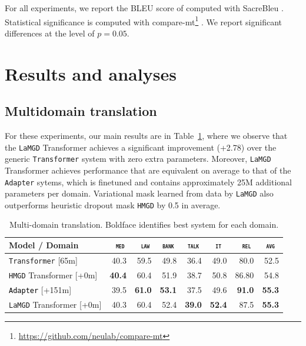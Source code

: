 \documentclass[11pt]{article}
\newcommand{\fyDone}[1]{\done[FY]\Todo[FY:]{\textcolor{orange}{#1}}}
\newcommand{\revision}[1]{\textcolor{black}{#1}}
\newcommand{\domain}[1]{\texttt{\textsc{#1}}}
\newcommand{\system}[1]{\texttt{{#1}}}
\newcommand{\SB}[1]{\textbf{#1}}
\begin{document}
For all experiments, we report the BLEU score of \citet{Papineni02bleu} computed with SacreBleu \citep{Post18call}. Statistical significance is computed with compare-mt\footnote{\url{https://github.com/neulab/compare-mt}} \cite{Neubig19compare-mt}. We report significant differences at the level of $p=0.05$.\fyDone{Check this}

\section{Results and analyses}

\subsection{Multidomain translation}
For these experiments, our main results are in Table~\ref{tab:mdmt}, where we observe that the \system{LaMGD} Transformer achieves a significant improvement (+2.78) over the generic \system{Transformer} system with zero extra parameters. Moreover, \system{LaMGD} Transformer achieves performance that are equivalent on average to that of the \system{Adapter} sytems, which is finetuned and contains approximately 25M additional parameters per domain. Variational mask learned from data by \system{LaMGD} also outperforms heuristic dropout mask \system{HMGD} by 0.5 in average.
\begin{table}[h!]
  \centering
  \begin{tabular}{|p{4cm}|*{7}{r|}} \hline
    Model / Domain & \multicolumn{1}{c|}{\domain{ med}} & \multicolumn{1}{c|}{\domain{ law}} & \multicolumn{1}{c|}{\domain{bank}} & \multicolumn{1}{c|}{\domain{talk}} & \multicolumn{1}{c|}{\domain{ it }} & \multicolumn{1}{c|}{\domain{ rel}} & \multicolumn{1}{c|}{\domain{avg}} \\ \hline 
    \system{Transformer}  \hfill{\footnotesize[65m]} & 40.3 & 59.5 & 49.8 & 36.4 & 49.0 & 80.0  & 52.5\\
    \system{HMGD} Transformer   \hfill{\footnotesize[+0m]}  & \SB{40.4} & 60.4 & 51.9 & 38.7 &	50.8 &	86.80 & 54.8 \\ 
    \revision{\system{Adapter}}   \hfill{\footnotesize[+151m]}  & 39.5 & \SB{61.0} & \SB{53.1} & 37.5 & 49.6 & \SB{91.0} & \SB{55.3} \\ 
    \system{LaMGD} Transformer   \hfill{\footnotesize[+0m]}  & 40.3 & 60.4 & 52.4 & \SB{39.0} & \SB{52.4} & 87.5 & \SB{55.3} \\ 
    \hline
  \end{tabular}
  \caption{Multi-domain translation. Boldface identifies best system for each domain.}
  \label{tab:mdmt}
\end{table}
\end{document}
